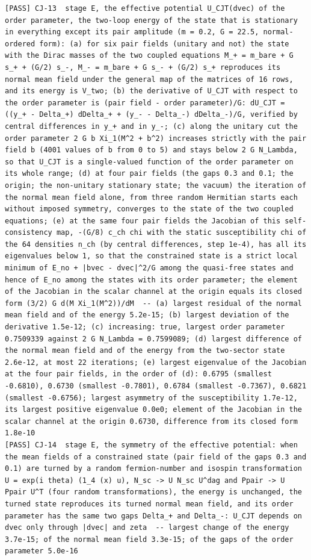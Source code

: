 \documentclass[
  10pt,
]{article}
\begin{document}
\begin{verbatim}
[PASS] CJ-13  stage E, the effective potential U_CJT(dvec) of the order parameter, the two-loop energy of the state that is stationary in everything except its pair amplitude (m = 0.2, G = 22.5, normal-ordered form): (a) for six pair fields (unitary and not) the state with the Dirac masses of the two coupled equations M_+ = m_bare + G s_+ + (G/2) s_-, M_- = m_bare + G s_- + (G/2) s_+ reproduces its normal mean field under the general map of the matrices of 16 rows, and its energy is V_two; (b) the derivative of U_CJT with respect to the order parameter is (pair field - order parameter)/G: dU_CJT = ((y_+ - Delta_+) dDelta_+ + (y_- - Delta_-) dDelta_-)/G, verified by central differences in y_+ and in y_-; (c) along the unitary cut the order parameter 2 G b Xi_1(M^2 + b^2) increases strictly with the pair field b (4001 values of b from 0 to 5) and stays below 2 G N_Lambda, so that U_CJT is a single-valued function of the order parameter on its whole range; (d) at four pair fields (the gaps 0.3 and 0.1; the origin; the non-unitary stationary state; the vacuum) the iteration of the normal mean field alone, from three random Hermitian starts each without imposed symmetry, converges to the state of the two coupled equations; (e) at the same four pair fields the Jacobian of this self-consistency map, -(G/8) c_ch chi with the static susceptibility chi of the 64 densities n_ch (by central differences, step 1e-4), has all its eigenvalues below 1, so that the constrained state is a strict local minimum of E_no + |bvec - dvec|^2/G among the quasi-free states and hence of E_no among the states with its order parameter; the element of the Jacobian in the scalar channel at the origin equals its closed form (3/2) G d(M Xi_1(M^2))/dM  -- (a) largest residual of the normal mean field and of the energy 5.2e-15; (b) largest deviation of the derivative 1.5e-12; (c) increasing: true, largest order parameter 0.7509339 against 2 G N_Lambda = 0.7599089; (d) largest difference of the normal mean field and of the energy from the two-sector state 2.6e-12, at most 22 iterations; (e) largest eigenvalue of the Jacobian at the four pair fields, in the order of (d): 0.6795 (smallest -0.6810), 0.6730 (smallest -0.7801), 0.6784 (smallest -0.7367), 0.6821 (smallest -0.6756); largest asymmetry of the susceptibility 1.7e-12, its largest positive eigenvalue 0.0e0; element of the Jacobian in the
scalar channel at the origin 0.6730, difference from its closed form 1.8e-10
[PASS] CJ-14  stage E, the symmetry of the effective potential: when the mean fields of a constrained state (pair field of the gaps 0.3 and 0.1) are turned by a random fermion-number and isospin transformation U = exp(i theta) (1_4 (x) u), N_sc -> U N_sc U^dag and Ppair -> U Ppair U^T (four random transformations), the energy is unchanged, the turned state reproduces its turned normal mean field, and its order parameter has the same two gaps Delta_+ and Delta_-: U_CJT depends on dvec only through |dvec| and zeta  -- largest change of the energy 3.7e-15; of the normal mean field 3.3e-15; of the gaps of the order parameter 5.0e-16

\end{verbatim}
\end{document}
